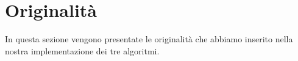 \chapter{Originalità\label{sec:originalita}}
\noindent In questa sezione vengono presentate le originalità che abbiamo inserito nella nostra implementazione dei tre algoritmi.